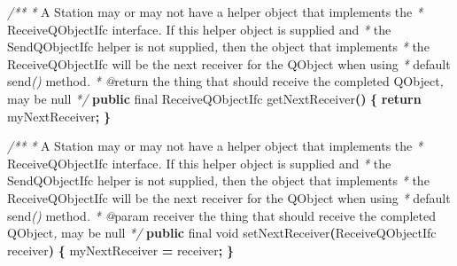 \documentclass[
]{book}
\newenvironment{Shaded}{\begin{snugshade}}{\end{snugshade}}
\newcommand{\CommentTok}[1]{\textcolor[rgb]{0.56,0.35,0.01}{\textit{#1}}}
\newcommand{\ControlFlowTok}[1]{\textcolor[rgb]{0.13,0.29,0.53}{\textbf{#1}}}
\newcommand{\DataTypeTok}[1]{\textcolor[rgb]{0.13,0.29,0.53}{#1}}
\newcommand{\FunctionTok}[1]{\textcolor[rgb]{0.00,0.00,0.00}{#1}}
\newcommand{\KeywordTok}[1]{\textcolor[rgb]{0.13,0.29,0.53}{\textbf{#1}}}
\newcommand{\NormalTok}[1]{#1}
\newcommand{\OperatorTok}[1]{\textcolor[rgb]{0.81,0.36,0.00}{\textbf{#1}}}
\theoremstyle{definition}
\theoremstyle{definition}
\theoremstyle{definition}
\theoremstyle{definition}
\theoremstyle{remark}
\begin{document}
\begin{Shaded}
\begin{Highlighting}[]
    \CommentTok{/**}
     \CommentTok{*}\NormalTok{  A Station may or may not have a helper object that implements the }
     \CommentTok{*}\NormalTok{  ReceiveQObjectIfc interface}\CommentTok{. }\NormalTok{ If this helper object is supplied and}
     \CommentTok{*}\NormalTok{  the SendQObjectIfc helper is not supplied}\CommentTok{,}\NormalTok{ then the object that implements}
     \CommentTok{*}\NormalTok{  the ReceiveQObjectIfc will be the next receiver for the QObject when using }
     \CommentTok{*}\NormalTok{  default send}\CommentTok{()}\NormalTok{ method}\CommentTok{.}
     \CommentTok{*} \CommentTok{@}\NormalTok{return the thing that should receive the completed QObject}\CommentTok{,}\NormalTok{ may be null}
     \CommentTok{*/}
    \KeywordTok{public} \DataTypeTok{final}\NormalTok{ ReceiveQObjectIfc }\FunctionTok{getNextReceiver}\OperatorTok{()} \OperatorTok{\{}
        \ControlFlowTok{return}\NormalTok{ myNextReceiver}\OperatorTok{;}
    \OperatorTok{\}}

    \CommentTok{/**}
     \CommentTok{*}\NormalTok{  A Station may or may not have a helper object that implements the }
     \CommentTok{*}\NormalTok{  ReceiveQObjectIfc interface}\CommentTok{. }\NormalTok{ If this helper object is supplied and}
     \CommentTok{*}\NormalTok{  the SendQObjectIfc helper is not supplied}\CommentTok{,}\NormalTok{ then the object that implements}
     \CommentTok{*}\NormalTok{  the ReceiveQObjectIfc will be the next receiver for the QObject when using }
     \CommentTok{*}\NormalTok{  default send}\CommentTok{()}\NormalTok{ method}\CommentTok{.}
     \CommentTok{*} \CommentTok{@}\NormalTok{param receiver the thing that should receive the completed QObject}\CommentTok{,}\NormalTok{ may be null}
     \CommentTok{*/}
    \KeywordTok{public} \DataTypeTok{final} \DataTypeTok{void} \FunctionTok{setNextReceiver}\OperatorTok{(}\NormalTok{ReceiveQObjectIfc receiver}\OperatorTok{)} \OperatorTok{\{}
\NormalTok{        myNextReceiver }\OperatorTok{=}\NormalTok{ receiver}\OperatorTok{;}
    \OperatorTok{\}}


\end{Highlighting}
\end{Shaded}
\end{document}
